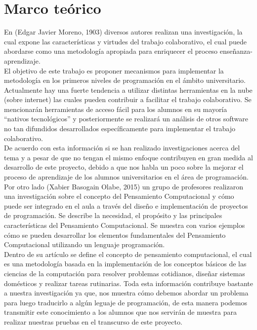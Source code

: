 \documentclass[12pt] {report}
\begin{document}
\section{Marco teórico}
En (Edgar Javier Moreno, 1903) diversos autores realizan una investigación, la cual expone las características y virtudes del trabajo colaborativo, el cual puede abordarse como una metodología apropiada para enriquecer el proceso enseñanza-aprendizaje.\\ 
El objetivo de este trabajo es proponer mecanismos para implementar la metodología en los primeros niveles de programación en el ámbito universitario. 
Actualmente hay una fuerte tendencia a utilizar distintas herramientas en la nube (sobre internet) las cuales pueden contribuir a facilitar el trabajo colaborativo. Se mencionarán herramientas de acceso fácil para los alumnos en su mayoría “nativos tecnológicos” y posteriormente se realizará un análisis de otros software no tan difundidos desarrollados específicamente para implementar el trabajo colaborativo.\\ 
De acuerdo con esta información si se han realizado investigaciones acerca del tema y a pesar de que no tengan el mismo enfoque  contribuyen en gran medida al desarrollo de este proyecto, debido a que nos habla un poco sobre la mejorar el proceso de aprendizaje de los alumnos universitarios en el área de programación.\\
Por otro lado (Xabier Basogain Olabe, 2015) un grupo de profesores realizaron una investigación sobre el concepto del Pensamiento Computacional y cómo puede ser integrado en el aula a través del diseño e implementación de proyectos de programación. Se describe la necesidad, el propósito y las principales características del Pensamiento Computacional. Se muestra con varios ejemplos cómo se pueden desarrollar los elementos fundamentales del Pensamiento Computacional utilizando un lenguaje programación.\\
Dentro de su artículo se define el concepto de pensamiento computacional, el cual es una metodología basada en la implementación de los conceptos básicos de las ciencias de la computación para resolver problemas cotidianos, diseñar sistemas domésticos y realizar tareas rutinarias.   
Toda esta información contribuye bastante a nuestra investigación ya que, nos muestra cómo debemos abordar un problema para luego traducirlo a algún leguaje de programación, de esta manera podemos transmitir este conocimiento a los alumnos que nos servirán de muestra para realizar nuestras pruebas en el transcurso de este proyecto.\\
\end{document}
